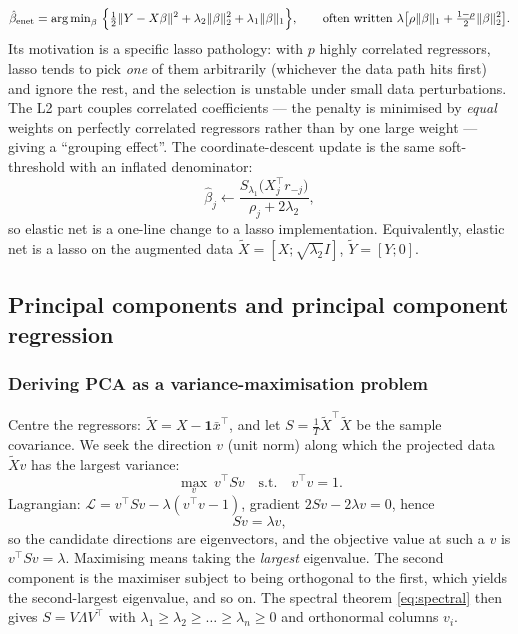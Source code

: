 \begin{equation}
  \hat\beta_{\text{enet}} = \argmin_\beta\ \Bigl\{\tfrac12\lVert Y-X\beta\rVert^2
  + \lambda_2\lVert\beta\rVert_2^2 + \lambda_1\lVert\beta\rVert_1\Bigr\},
  \qquad
  \text{often written } \lambda\bigl[\rho\lVert\beta\rVert_1 + \tfrac{1-\rho}{2}\lVert\beta\rVert_2^2\bigr].
  \label{eq:elasticnet}
\end{equation}
Its motivation is a specific lasso pathology: with $p$ highly correlated regressors, lasso
tends to pick \emph{one} of them arbitrarily (whichever the data path hits first) and
ignore the rest, and the selection is unstable under small data perturbations. The L2
part couples correlated coefficients --- the penalty is minimised by \emph{equal} weights
on perfectly correlated regressors rather than by one large weight --- giving a
``grouping effect''. The coordinate-descent update is the same soft-threshold with an
inflated denominator:
\begin{equation}
  \hat\beta_j \leftarrow \frac{S_{\lambda_1}\bigl(X_j^{\top}r_{-j}\bigr)}{\rho_j+2\lambda_2},
  \label{eq:enet:cd}
\end{equation}
so elastic net is a one-line change to a lasso implementation. Equivalently, elastic net
is a lasso on the augmented data $\tilde X=[X;\sqrt{\lambda_2}I]$, $\tilde Y=[Y;0]$.

\subsection{Principal components and principal component regression}
\label{sec:pcr}

\subsubsection{Deriving PCA as a variance-maximisation problem}
\label{sec:pca:derivation}

Centre the regressors: $\tilde X = X-\mathbf 1\bar x^{\top}$, and let
$S=\tfrac1T \tilde X^{\top}\tilde X$ be the sample covariance. We seek the direction
$v$ (unit norm) along which the projected data $\tilde X v$ has the largest variance:
\begin{equation}
  \max_{v}\ v^{\top}Sv \quad\text{s.t.}\quad v^{\top}v=1 .
  \label{eq:pca:max}
\end{equation}
Lagrangian: $\mathcal L = v^{\top}Sv-\lambda(v^{\top}v-1)$, gradient
$2Sv-2\lambda v=0$, hence
\begin{equation}
  S v = \lambda v ,
  \label{eq:pca:eigen}
\end{equation}
so the candidate directions are eigenvectors, and the objective value at such a $v$ is
$v^{\top}Sv=\lambda$. Maximising means taking the \emph{largest} eigenvalue. The second
component is the maximiser subject to being orthogonal to the first, which yields the
second-largest eigenvalue, and so on. The spectral theorem
\eqref{eq:spectral} then gives $S=V\Lambda V^{\top}$ with
$\lambda_1\ge\lambda_2\ge\dots\ge\lambda_n\ge0$ and orthonormal columns $v_i$.

